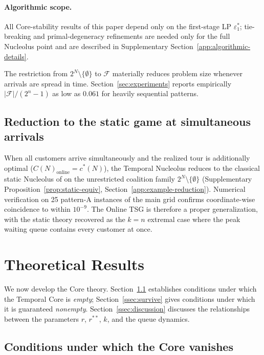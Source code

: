\documentclass[11pt]{article}
\theoremstyle{plain}
\theoremstyle{definition}
\theoremstyle{remark}
\newcommand{\F}{\mathcal{F}}
\newcommand{\cstar}{c^{\ast}}
\begin{document}
\paragraph{Algorithmic scope.} All Core-stability results of this paper depend only on the first-stage LP $\varepsilon_1^{\ast}$; tie-breaking and primal-degeneracy refinements are needed only for the full Nucleolus point and are described in Supplementary Section~\ref{app:algorithmic-details}.

The restriction from $2^N\setminus\{\emptyset\}$ to $\F$ materially reduces problem size whenever arrivals are spread in time. Section~\ref{sec:experiments} reports empirically $|\F|/(2^n-1)$ as low as $0.061$ for heavily sequential patterns.

\subsection{Reduction to the static game at simultaneous arrivals}

When all customers arrive simultaneously and the realized tour is additionally optimal ($C(N)_{\text{online}}=\cstar(N)$), the Temporal Nucleolus reduces to the classical static Nucleolus of \citet{potters1992tsg} on the unrestricted coalition family $2^N\setminus\{\emptyset\}$ (Supplementary Proposition~\ref{prop:static-equiv}, Section~\ref{app:example-reduction}). Numerical verification on 25 pattern-A instances of the main grid confirms coordinate-wise coincidence to within $10^{-9}$. The Online TSG is therefore a proper generalization, with the static theory recovered as the $k=n$ extremal case where the peak waiting queue contains every customer at once.

\section{Theoretical Results}
\label{sec:theory}

We now develop the Core theory. Section~\ref{ssec:empty} establishes conditions under which the Temporal Core is \emph{empty}; Section~\ref{ssec:survive} gives conditions under which it is guaranteed \emph{nonempty}. Section~\ref{ssec:discussion} discusses the relationships between the parameters $r$, $r^{\ast\ast}$, $k$, and the queue dynamics.

\subsection{Conditions under which the Core vanishes}
\label{ssec:empty}
\end{document}
